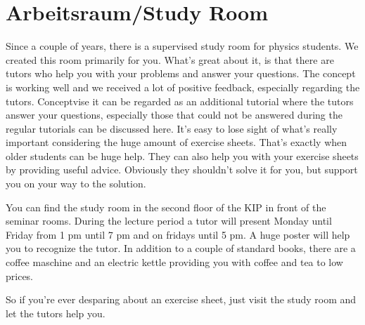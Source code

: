 \section{Arbeitsraum/Study Room}
\label{sec:arbeitsraum}
Since a couple of years, there is a supervised study room for physics students. We created this room primarily for you. What's great about it, is that there are tutors who help you with your problems and answer your questions. The concept is working well and we received a lot of positive feedback, especially regarding the tutors. Conceptvise it can be regarded as an additional tutorial where the tutors answer your questions, especially those that could not be answered during the regular tutorials can be discussed here. It's easy to lose sight of what's really important considering the huge amount of exercise sheets. That's exactly when older students can be huge help. They can also help you with your exercise sheets by providing useful advice. Obviously they shouldn't solve it for you, but support you on your way to the solution.

You can find the study room in the second floor of the KIP in front of the seminar rooms. During the lecture period a tutor will present Monday until Friday from 1 pm until 7 pm and on fridays until 5 pm. A huge poster will help you to recognize the tutor. In addition to a couple of standard books, there are a coffee maschine and an electric kettle providing you with coffee and tea to low prices.

So if you're ever desparing about an exercise sheet, just visit the study room and let the tutors help you.

